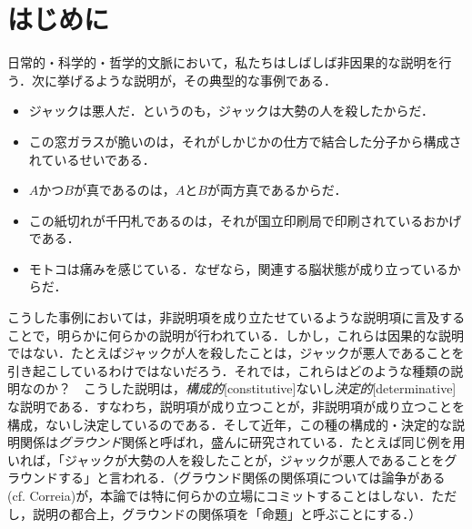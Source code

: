\documentclass[twoside,14Q,dvipdfmx]{jsarticle}
\theoremstyle{definition}
\begin{document}
\section{はじめに}\label{introduction}
日常的・科学的・哲学的文脈において，私たちはしばしば非因果的な説明を行う．次に挙げるような説明が，その典型的な事例である．
	\begin{itemize}
	\item ジャックは悪人だ．というのも，ジャックは大勢の人を殺したからだ．
	\item この窓ガラスが脆いのは，それがしかじかの仕方で結合した分子から構成されているせいである．
	\item $A$かつ$B$が真であるのは，$A$と$B$が両方真であるからだ．
	\item この紙切れが千円札であるのは，それが国立印刷局で印刷されているおかげである．
	\item モトコは痛みを感じている．なぜなら，関連する脳状態が成り立っているからだ．
	\end{itemize}
こうした事例においては，非説明項を成り立たせているような説明項に言及することで，明らかに何らかの説明が行われている．しかし，これらは因果的な説明ではない．たとえばジャックが人を殺したことは，ジャックが悪人であることを引き起こしているわけではないだろう．それでは，これらはどのような種類の説明なのか？　こうした説明は，\emph{構成的}[constitutive]ないし\emph{決定的}[determinative]な説明である．すなわち，説明項が成り立つことが，非説明項が成り立つことを構成，ないし決定しているのである．そして近年，この種の構成的・決定的な説明関係は\emph{グラウンド}関係と呼ばれ，盛んに研究されている．たとえば同じ例を用いれば，「ジャックが大勢の人を殺したことが，ジャックが悪人であることをグラウンドする」と言われる．（グラウンド関係の関係項については論争がある (cf. Correia\cite{Correia2020})が，本論では特に何らかの立場にコミットすることはしない．ただし，説明の都合上，グラウンドの関係項を「命題」と呼ぶことにする．）
\end{document}

